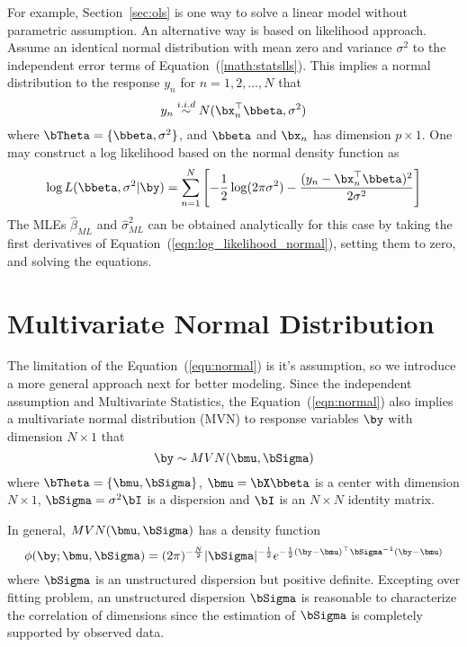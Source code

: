 For example, Section~\ref{sec:ols} is one way to solve a linear model
without parametric assumption. An alternative way is based on likelihood
approach.
Assume an identical normal distribution with mean zero and variance $\sigma^2$
to the independent error terms of Equation~(\ref{math:statslls}).
This implies a normal distribution
to the response $y_n$ for $n=1,2,\ldots, N$ that
\begin{equation}
y_n \stackrel{i.i.d}{\sim} N(\bx_n^\top\bbeta, \sigma^2)
\label{eqn:normal}
\end{equation}
where $\bTheta = \{\bbeta, \sigma^2\}$, and
$\bbeta$ and $\bx_n$ has dimension $p\times 1$.
One may construct a log likelihood based on the normal density function as
\begin{equation}
\log L(\bbeta, \sigma^2|\by) = \sum_{n = 1}^N
\left[
-\frac{1}{2} \log (2\pi \sigma^2) -
\frac{(y_n - \bx_n^\top\bbeta)^2}{2\sigma^2}
\right]
\label{eqn:log_likelihood_normal}
\end{equation}
The MLEs $\hat{\beta}_{ML}$ and
$\hat{\sigma}^2_{ML}$ can be obtained analytically for this case by
taking the first derivatives of Equation~(\ref{eqn:log_likelihood_normal}),
setting them to zero, and
solving the equations.




\section{Multivariate Normal Distribution}

The limitation of the Equation~(\ref{eqn:normal}) is it's
assumption, so we introduce a more general approach next for better
modeling. Since the independent assumption and Multivariate Statistics, the
Equation~(\ref{eqn:normal}) also
implies a multivariate normal distribution
(MVN)
to response variables $\by$ with dimension $N\times 1$ that
\begin{equation}
\by \sim MVN(\bmu, \bSigma)
\label{eqn:mvn_n}
\end{equation}
where $\bTheta = \{\bmu, \bSigma\}$, $\bmu = \bX\bbeta$ is a center with
dimension $N\times 1$, $\bSigma = \sigma^2\bI$ is a dispersion
and $\bI$ is an $N\times N$ identity matrix.

In general, $MVN(\bmu, \bSigma)$ has a density function
\begin{equation*}
\displaystyle
\phi(\by; \bmu, \bSigma) =
(2\pi)^{-\frac{N}{2}} |\bSigma|^{-\frac{1}{2}}
e^{-\frac{1}{2} (\by - \bmu)^\top \bSigma^{-1} (\by - \bmu)}
\end{equation*}
where $\bSigma$ is an unstructured dispersion but positive definite.
Excepting over fitting problem,
an unstructured dispersion $\bSigma$ is reasonable to
characterize the correlation of dimensions since the estimation of
$\bSigma$ is completely supported by observed data.

